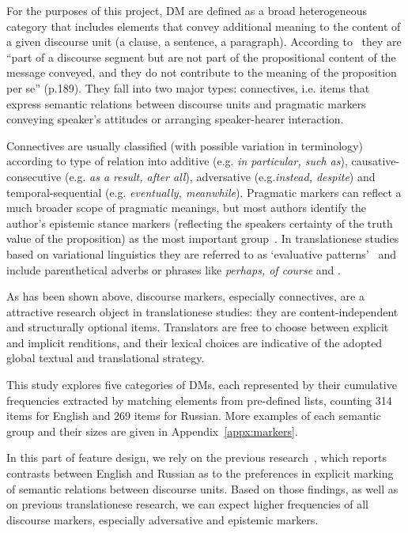 For the purposes of this project, \gls{DM} are defined as a broad heterogeneous category that includes elements that convey additional meaning to the content of a given discourse unit (a clause, a sentence, a paragraph). According to~\citet{Fraser2006} they are ``part of a discourse segment but are not part of the propositional content of the message conveyed, and they do not contribute to the meaning of the proposition per se'' (p.189). They fall into two major types: connectives, i.e. items that express semantic relations between discourse units and pragmatic markers conveying speaker's attitudes or arranging speaker-hearer interaction. 

Connectives are usually classified (with possible variation in terminology) according to type of relation into additive (e.g. \textit{in particular, such as}), causative-consecutive (e.g. \textit{as a result, after all}), adversative (e.g.\textit{instead, despite}) and temporal-sequential (e.g. \textit{eventually, meanwhile}). 
Pragmatic markers can reflect a much broader scope of pragmatic meanings, but most authors identify the author's epistemic stance markers (reflecting the speakers certainty of the truth value of the proposition) as the most important group~\cite[see][]{Fraser2006,Halliday1989,Biber1999}. In translationese studies based on variational linguistics they are referred to as `evaluative patterns'~\cite{Lapshinova2017} and include parenthetical adverbs or phrases like \textit{perhaps, of course} and .

As has been shown above, discourse markers, especially connectives, are a attractive research object in translationese studies: they are content-independent and structurally optional items. Translators are free to choose between explicit and implicit renditions, and their lexical choices are indicative of the adopted global textual and translational strategy.

This study explores five categories of DMs, each represented by their cumulative frequencies extracted by matching elements from pre-defined lists, counting 314 items for English and 269 items for Russian. More examples of each semantic group and their sizes are given in Appendix~\ref{appx:markers}.

In this part of feature design, we rely on the previous research~\cite{Kunilovskaya2017conn}, which reports contrasts between English and Russian as to the preferences in explicit marking of semantic relations between discourse units. Based on those findings, as well as on previous translationese research, we can expect higher frequencies of all discourse markers, especially adversative and epistemic markers.

